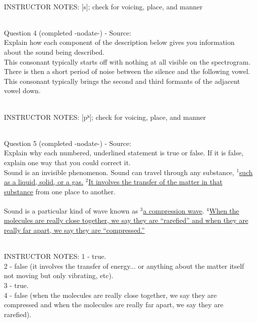 \documentclass[12pt]{article}
\begin{document}
~\\
INSTRUCTOR NOTES: [s]; check for voicing, place, and manner


~\\

{\large Question 4} (completed -nodate-) - Source: \\

Explain how each component of the description below gives you information about the sound being described.\\

This consonant typically starts off with nothing at all visible on the spectrogram. There is then a short period of noise between the silence and the following vowel. This consonant typically brings the second and third formants of the adjacent vowel down.


~\\
INSTRUCTOR NOTES: [pʰ]; check for voicing, place, and manner


~\\

{\large Question 5} (completed -nodate-) - Source: \\

Explain why each numbered, underlined statement is true or false. If it is false, explain one way that you could correct it.\\

Sound is an invisible phenomenon. Sound can travel through any substance, $^1$\ul{such as a liquid, solid, or a gas.} $^2$\ul{It involves the transfer of the matter in that substance} from one place to another.\\\\Sound is a particular kind of wave known as $^3$\ul{a compression wave}. $^4$\ul{When the molecules are really close together, we say they are ``rarefied'' and when they are really far apart, we say they are ``compressed.''}


~\\
INSTRUCTOR NOTES: 1 - true.\\2 - false (it involves the transfer of energy... or anything about the matter itself not moving but only vibrating, etc). \\3 - true.\\4 - false (when the molecules are really close together, we say they are compressed and when the molecules are really far apart, we say they are rarefied).


~\\
\end{document}
